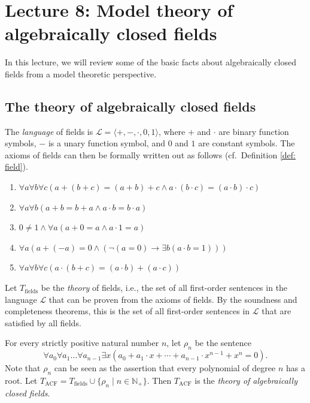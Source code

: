 \documentclass[a4paper]{memoir}
\theoremstyle{definition}
\newcommand{\mc}{\mathcal}
\begin{document}
\chapter{Lecture 8: Model theory of algebraically closed fields} \label{chapter_8}

In this lecture, we will review some of the basic facts about algebraically 
closed fields from a model theoretic perspective.

\section{The theory of algebraically closed fields}

The \emph{language} of fields is $\mc{L} = \langle +, -, \cdot, 0, 1 \rangle$, 
where $+$ and $\cdot$ are binary function symbols, $-$ is a unary function symbol, 
and $0$ and $1$ are constant symbols. The axioms of fields can then be formally 
written out as follows (cf.\ Definition \ref{def: field}).
\begin{enumerate}
  \item $\forall a \forall b \forall c ( a + (b + c) = (a + b) + c \wedge 
  a \cdot (b \cdot c) = (a \cdot b) \cdot c)$
  \item $\forall a \forall b (a + b = b + a \wedge a \cdot b = b \cdot a)$
  \item $0 \neq 1 \wedge \forall a (a + 0 = a \wedge a \cdot 1 = a)$
  \item $\forall a (a + (-a) = 0 \wedge (\neg (a = 0) \rightarrow 
  \exists b (a\cdot b = 1)))$
  \item $\forall a \forall b \forall c (a \cdot (b + c) = (a \cdot b) + 
  (a \cdot c))$ 
\end{enumerate}

Let $T_{\mathrm{fields}}$ be the \emph{theory} of fields, i.e., the set of all 
first-order sentences in the language $\mc{L}$ that can be proven from the 
axioms of fields. By the soundness and completeness theorems, this is the 
set of all first-order sentences in $\mc{L}$ that are satisfied by all fields.

For every strictly positive natural number $n$, let $\rho_n$ be the sentence
\[
  \forall a_0 \forall a_1 \ldots \forall a_{n-1} \exists x 
  \left( a_0 + a_1 \cdot x + \cdots + a_{n-1} \cdot x^{n-1} + x^n = 0 \right).
\]
Note that $\rho_n$ can be seen as the assertion that every polynomial of degree 
$n$ has a root. Let $T_{\mathrm{ACF}} = T_{\mathrm{fields}} \cup 
\{\rho_n \mid n \in \mathbb{N}_+\}$. Then $T_{\mathrm{ACF}}$ is the 
\emph{theory of algebraically closed fields}.
\end{document}
